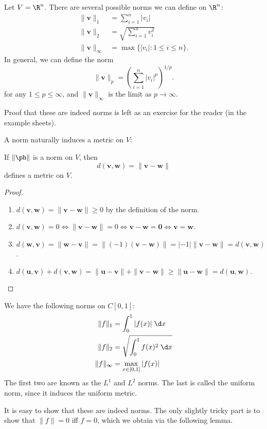\documentclass[a4paper]{article}
\begin{document}
\begin{eg}
  Let $V = \R^n$. There are several possible norms we can define on $\R^n$:
  \begin{align*}
    \|\mathbf{v}\|_1 &= \sum_{i = 1}^n |v_i|\\
    \|\mathbf{v}\|_2 &= \sqrt{\sum_{i = 1}^n v_i^2}\\
    \|\mathbf{v}\|_\infty &= \max \{|v_i|: 1 \leq i \leq n\}.
  \end{align*}
  In general, we can define the norm
  \[
    \|\mathbf{v}\|_p = \left(\sum_{i = 1}^n |v_i|^p\right)^{1/p}.
  \]
  for any $1 \leq p \leq \infty$, and $\|\mathbf{v}\|_\infty$ is the limit as $p\to \infty$.

  Proof that these are indeed norms is left as an exercise for the reader (in the example sheets).
\end{eg}

A norm naturally induces a metric on $V$:
\begin{lemma}
  If $\|\ph\|$ is a norm on $V$, then
  \[
    d(\mathbf{v}, \mathbf{w}) = \|\mathbf{v} - \mathbf{w}\|
  \]
  defines a metric on $V$.
\end{lemma}

\begin{proof}\leavevmode
  \begin{enumerate}
    \item $d(\mathbf{v}, \mathbf{w}) = \|\mathbf{v} - \mathbf{w}\| \geq 0$ by the definition of the norm.
    \item $d(\mathbf{v}, \mathbf{w}) = 0 \Leftrightarrow \|\mathbf{v} - \mathbf{w}\| = 0 \Leftrightarrow \mathbf{v} - \mathbf{w} = \mathbf{0} \Leftrightarrow \mathbf{v} = \mathbf{w}$.
    \item $d(\mathbf{w}, \mathbf{v}) = \|\mathbf{w} - \mathbf{v}\| = \|(-1)(\mathbf{v} - \mathbf{w})\| = |-1| \|\mathbf{v} - \mathbf{w}\| = d(\mathbf{v}, \mathbf{w})$.
    \item $d(\mathbf{u}, \mathbf{v}) + d(\mathbf{v}, \mathbf{w}) = \|\mathbf{u} - \mathbf{v}\| + \|\mathbf{v} - \mathbf{w}\| \geq \|\mathbf{u} - \mathbf{w}\| = d(\mathbf{u}, \mathbf{w})$.
  \end{enumerate}
\end{proof}

\begin{eg}
  We have the following norms on $C[0, 1]$:
  \begin{align*}
    \|f\|_1 &= \int_0^1 |f(x)|\;\d x\\
    \|f\|_2 &= \sqrt{\int_0^1 f(x)^2 \;\d x}\\
    \|f\|_{\infty} &= \max_{x \in [0, 1]}|f(x)|
  \end{align*}
  The first two are known as the $L^1$ and $L^2$ norms. The last is called the uniform norm, since it induces the uniform metric.
\end{eg}
It is easy to show that these are indeed norms. The only slightly tricky part is to show that $\|f\| = 0$ iff $f = 0$, which we obtain via the following lemma.
\end{document}
